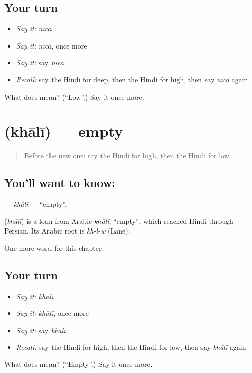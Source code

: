 \subsection*{Your turn}
\begin{itemize}
\raggedright
  \item \emph{Say it:} \emph{nīcā}
  \item \emph{Say it:} \emph{nīcā}, once more
  \item \emph{Say it:} say \emph{nīcā}
  \item \emph{Recall:} say the Hindi for deep, then the Hindi for high, then say \emph{nīcā} again
\end{itemize}

\begin{tcolorbox}[breakable,colback=teal!4,colframe=teal!35!black,title={Before you move on}]
What does  mean? (\textquotedblleft{}Low\textquotedblright{}.) Say it once more.
\end{tcolorbox}
\section[\texorpdfstring{\hi{ख़ाली} (khālī)}{ख़ाली (khālī)}]{ (khālī) — empty}

\label{lesson:HI-C158-khali}



\begin{quote}
Before the new one: say the Hindi for high, then the Hindi for low.
\end{quote}

\subsection*{You'll want to know: }
\textbf{} — \emph{khālī} — \textquotedblleft{}empty\textquotedblright{}.

\begin{cousinweb}
\textbf{} (\emph{khālī}) is a loan from Arabic \emph{khālī}, \textquotedblleft{}empty\textquotedblright{}, which reached Hindi through Persian. Its Arabic root is \emph{kh-l-w} (Lane).
\end{cousinweb}

\begin{grammarlens}[title={What you've built}]
One more word for this chapter.
\end{grammarlens}

\subsection*{Your turn}
\begin{itemize}
\raggedright
  \item \emph{Say it:} \emph{khālī}
  \item \emph{Say it:} \emph{khālī}, once more
  \item \emph{Say it:} say \emph{khālī}
  \item \emph{Recall:} say the Hindi for high, then the Hindi for low, then say \emph{khālī} again
\end{itemize}

\begin{tcolorbox}[breakable,colback=teal!4,colframe=teal!35!black,title={Before you move on}]
What does  mean? (\textquotedblleft{}Empty\textquotedblright{}.) Say it once more.
\end{tcolorbox}
